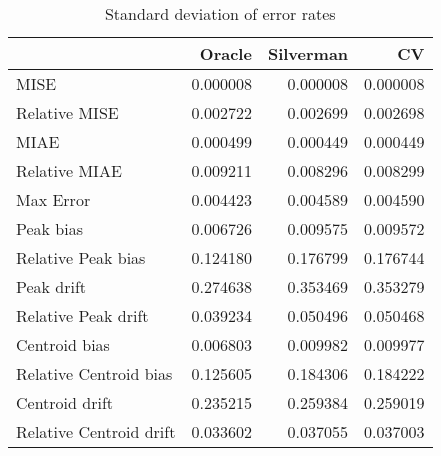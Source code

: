 \begin{table}[ht]
\centering
\begin{tabular}{lrrr}
  \hline
 & Oracle & Silverman & CV \\ 
  \hline
MISE & 0.000008 & 0.000008 & 0.000008 \\ 
  Relative MISE & 0.002722 & 0.002699 & 0.002698 \\ 
  MIAE & 0.000499 & 0.000449 & 0.000449 \\ 
  Relative MIAE & 0.009211 & 0.008296 & 0.008299 \\ 
  Max Error & 0.004423 & 0.004589 & 0.004590 \\ 
  Peak bias & 0.006726 & 0.009575 & 0.009572 \\ 
  Relative Peak bias & 0.124180 & 0.176799 & 0.176744 \\ 
  Peak drift & 0.274638 & 0.353469 & 0.353279 \\ 
  Relative Peak drift & 0.039234 & 0.050496 & 0.050468 \\ 
  Centroid bias & 0.006803 & 0.009982 & 0.009977 \\ 
  Relative Centroid bias & 0.125605 & 0.184306 & 0.184222 \\ 
  Centroid drift & 0.235215 & 0.259384 & 0.259019 \\ 
  Relative Centroid drift & 0.033602 & 0.037055 & 0.037003 \\ 
   \hline
\end{tabular}
\caption{Standard deviation of error rates} 
\label{tbl:stddev_error_rates}
\end{table}
